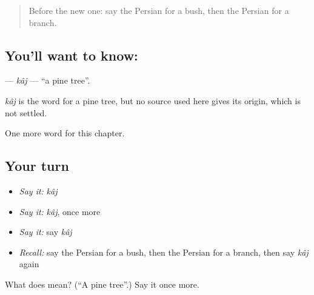 \begin{quote}
Before the new one: say the Persian for a bush, then the Persian for a branch.
\end{quote}

\subsection*{You'll want to know: }
\textbf{} — \emph{kâj} — \textquotedblleft{}a pine tree\textquotedblright{}.

\begin{cousinweb}
\emph{kâj} is the word for a pine tree, but no source used here gives its origin, which is not settled.
\end{cousinweb}

\begin{grammarlens}[title={What you've built}]
One more word for this chapter.
\end{grammarlens}

\subsection*{Your turn}
\begin{itemize}
\raggedright
  \item \emph{Say it:} \emph{kâj}
  \item \emph{Say it:} \emph{kâj}, once more
  \item \emph{Say it:} say \emph{kâj}
  \item \emph{Recall:} say the Persian for a bush, then the Persian for a branch, then say \emph{kâj} again
\end{itemize}

\begin{tcolorbox}[breakable,colback=teal!4,colframe=teal!35!black,title={Before you move on}]
What does  mean? (\textquotedblleft{}A pine tree\textquotedblright{}.) Say it once more.
\end{tcolorbox}

